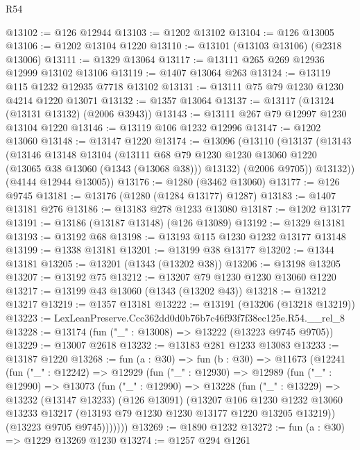 \begin{lexlean}{R54}
\begin{coremodule}
@13102 := @126 @12944
@13103 := @1202 @13102
@13104 := @126 @13005
@13106 := @1202 @13104 @1220
@13110 := @13101 (@13103 @13106) (@2318 @13006)
@13111 := @1329 @13064
@13117 := @13111 @265 @269 @12936 @12999 @13102 @13106
@13119 := @1407 @13064 @263
@13124 := @13119 @115 @1232 @12935 @7718 @13102
@13131 := @13111 @75 @79 @1230 @1230 @4214 @1220 @13071
@13132 := @1357 @13064
@13137 := @13117 (@13124 (@13131 @13132) (@2006 @3943))
@13143 := @13111 @267 @79 @12997 @1230 @13104 @1220
@13146 := @13119 @106 @1232 @12996
@13147 := @1202 @13060
@13148 := @13147 @1220
@13174 := @13096
    (@13110
      (@13137
        (@13143
          (@13146
            @13148
            @13104
            (@13111
              @68
              @79
              @1230
              @1230
              @13060
              @1220
              (@13065 @38 @13060 (@1343 (@13068 @38)))
              @13132)
            (@2006 @9705))
          @13132))
      (@4144 @12944 @13005))
@13176 := @1280 (@3462 @13060)
@13177 := @126 @9745
@13181 := @13176 (@1280 (@1284 @13177) @1287)
@13183 := @1407 @13181 @276
@13186 := @13183 @278 @1233 @13080
@13187 := @1202 @13177
@13191 := @13186 (@13187 @13148) (@126 @13089)
@13192 := @1329 @13181
@13193 := @13192 @68
@13198 := @13193 @115 @1230 @1232 @13177 @13148
@13199 := @1338 @13181
@13201 := @13199 @38 @13177
@13202 := @1344 @13181
@13205 := @13201 (@1343 (@13202 @38))
@13206 := @13198 @13205
@13207 := @13192 @75
@13212 := @13207 @79 @1230 @1230 @13060 @1220
@13217 := @13199 @43 @13060 (@1343 (@13202 @43))
@13218 := @13212 @13217
@13219 := @1357 @13181
@13222 := @13191 (@13206 (@13218 @13219))
@13223 := LexLeanPreserve.Ccc362dd0d0b76b7c46f93f7f38ec125e.R54.__rel_8
@13228 := @13174 (fun ("_" : @13008) => @13222 (@13223 @9745 @9705))
@13229 := @13007 @2618
@13232 := @13183 @281 @1233 @13083
@13233 := @13187 @1220
@13268 := fun (a : @30) =>
  fun (b : @30) =>
  @11673
    (@12241
      (fun ("_" : @12242) =>
      @12929
        (fun ("_" : @12930) =>
        @12989
          (fun ("_" : @12990) =>
          @13073
            (fun ("_" : @12990) =>
            @13228
              (fun ("_" : @13229) =>
              @13232
                (@13147 @13233)
                (@126 @13091)
                (@13207
                  @106
                  @1230
                  @1232
                  @13060
                  @13233
                  @13217
                  (@13193 @79 @1230 @1230 @13177 @1220 @13205 @13219))
                (@13223 @9705 @9745)))))))
@13269 := @1890 @1232
@13272 := fun (a : @30) => @1229 @13269 @1230
@13274 := @1257 @294 @1261

\end{coremodule}
\end{lexlean}
